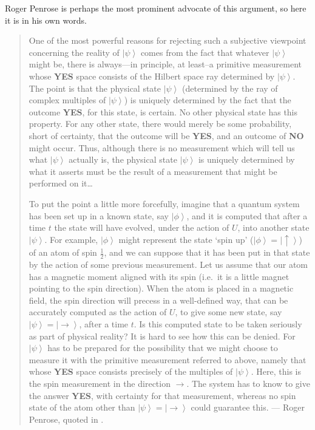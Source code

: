 \documentclass[DIV=calc,fontsize=12pt]{scrartcl} %
\theoremstyle{definition}
\theoremstyle{plain}
\newcommand{\Ket}[1]{\ensuremath{\left \vert #1 \right \rangle}}
\begin{document}
Roger Penrose is perhaps the most prominent advocate of this argument,
so here it is in his own words.

\begin{quotation}
One of the most powerful reasons for rejecting such a subjective
viewpoint concerning the reality of $\Ket{\psi}$ comes from the fact
that whatever $\Ket{\psi}$ might be, there is always---in principle,
at least--a primitive measurement whose \textbf{YES} space consists
of the Hilbert space ray determined by $\Ket{\psi}$. The point is
that the physical state $\Ket{\psi}$ (determined by the ray of
complex multiples of $\Ket{\psi}$) is uniquely determined by the
fact that the outcome \textbf{YES}, for this state, is certain. No
other physical state has this property. For any other state, there
would merely be some probability, short of certainty, that the
outcome will be \textbf{YES}, and an outcome of \textbf{NO} might
occur. Thus, although there is no measurement which will tell us
what $\Ket{\psi}$ actually is, the physical state $\Ket{\psi}$ is
uniquely determined by what it asserts must be the result of a
measurement that might be performed on it\ldots

To put the point a little more forcefully, imagine that a quantum
system has been set up in a known state, say $\Ket{\phi}$, and it is
computed that after a time $t$ the state will have evolved, under
the action of $U$, into another state $\Ket{\psi}$. For example,
$\Ket{\phi}$ might represent the state `spin up' ($\Ket{\phi} =
\Ket{\uparrow}$) of an atom of spin $\frac{1}{2}$, and we can
suppose that it has been put in that state by the action of some
previous measurement. Let us assume that our atom has a magnetic
moment aligned with its spin (i.e.\ it is a little magnet pointing
to the spin direction).  When the atom is placed in a magnetic
field, the spin direction will precess in a well-defined way, that
can be accurately computed as the action of $U$, to give some new
state, say $\Ket{\psi} = \Ket{\rightarrow}$, after a time $t$. Is
this computed state to be taken seriously as part of physical
reality? It is hard to see how this can be denied. For $\Ket{\psi}$
has to be prepared for the possibility that we might choose to
measure it with the primitive measurement referred to above, namely
that whose \textbf{YES} space consists precisely of the multiples of
$\Ket{\psi}$. Here, this is the spin measurement in the direction
$\rightarrow$. The system has to know to give the answer
\textbf{YES}, with certainty for that measurement, whereas no spin
state of the atom other than $\Ket{\psi} = \Ket{\rightarrow}$ could
guarantee this. --- Roger Penrose, quoted in \cite{Fuchs2011}.
\end{quotation}
\end{document}
